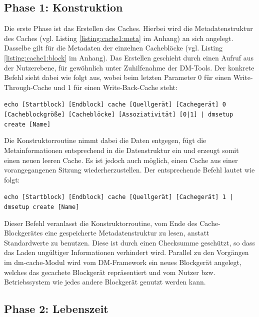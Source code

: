 \subsection{Phase 1: Konstruktion}

Die erste Phase ist das Erstellen des Caches. Hierbei wird die Metadatenstruktur des Caches (vgl. Listing \ref{listing:cache1:meta} im Anhang) an sich angelegt.
Dasselbe gilt für die Metadaten der einzelnen Cacheblöcke (vgl. Listing \ref{listing:cache1:block} im Anhang). Das Erstellen geschieht durch einen Aufruf aus
der Nutzerebene, für gewöhnlich unter Zuhilfenahme der \ac{DM}-Tools. Der konkrete Befehl sieht dabei wie folgt aus, wobei beim letzten Parameter 0 für einen
Write-Through-Cache und 1 für einen Write-Back-Cache steht:

\begin{flushleft}
\hspace{0.25cm} \small \texttt{echo [Startblock] [Endblock] cache [Quellgerät] [Cachegerät] 0 [Cacheblockgröße] [Cacheblöcke] [Assoziativität] [0|1] | dmsetup
create [Name]}
\end{flushleft}

Die Konstruktorroutine nimmt dabei die Daten entgegen, fügt die Metainformationen entsprechend in die Datenstruktur ein und erzeugt somit einen neuen leeren
Cache. Es ist jedoch auch möglich, einen Cache aus einer vorangegangenen Sitzung wiederherzustellen. Der entsprechende Befehl lautet wie folgt:

\begin{flushleft}
\hspace{0.25cm} \small \texttt{echo [Startblock] [Endblock] cache [Quellgerät] [Cachegerät] 1 | dmsetup create [Name]}
\end{flushleft}

Dieser Befehl veranlasst die Konstruktorroutine, vom Ende des Cache-Blockgerätes eine gespeicherte Metadatenstruktur zu lesen, anstatt Standardwerte
zu benutzen. Diese ist durch einen Checksumme geschützt, so dass das Laden ungültiger Informationen verhindert wird. Parallel zu den Vorgängen im
dm-cache-Modul wird vom \ac{DM}-Framework ein neues Blockgerät angelegt, welches das gecachete Blockgerät repräsentiert und vom Nutzer bzw. Betriebssystem wie
jedes andere Blockgerät genutzt werden kann.

\subsection{Phase 2: Lebenszeit}

